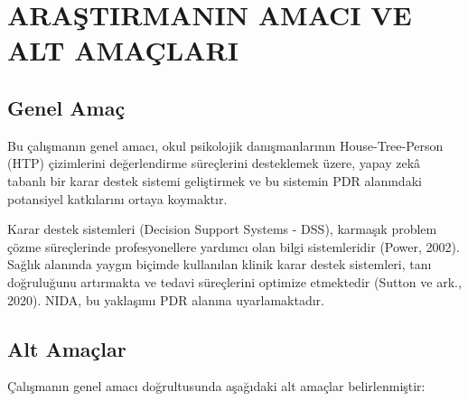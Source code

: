 
\chapter{ARAŞTIRMANIN AMACI VE ALT AMAÇLARI}

\section{Genel Amaç}

Bu çalışmanın genel amacı, okul psikolojik danışmanlarının House-Tree-Person (HTP) çizimlerini değerlendirme süreçlerini desteklemek üzere, yapay zekâ tabanlı bir karar destek sistemi geliştirmek ve bu sistemin PDR alanındaki potansiyel katkılarını ortaya koymaktır.

Karar destek sistemleri (Decision Support Systems - DSS), karmaşık problem çözme süreçlerinde profesyonellere yardımcı olan bilgi sistemleridir (Power, 2002). Sağlık alanında yaygın biçimde kullanılan klinik karar destek sistemleri, tanı doğruluğunu artırmakta ve tedavi süreçlerini optimize etmektedir (Sutton ve ark., 2020). NIDA, bu yaklaşımı PDR alanına uyarlamaktadır.

\section{Alt Amaçlar}

Çalışmanın genel amacı doğrultusunda aşağıdaki alt amaçlar belirlenmiştir:

